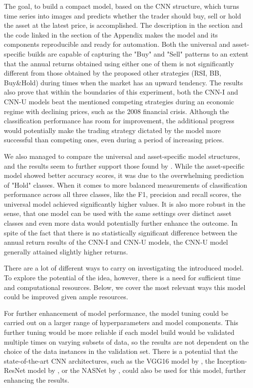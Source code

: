 \documentclass[12pt, a4paper]{article}
\begin{document}
The goal, to build a compact model, based on the CNN structure, which turns time series into images and predicts whether the trader should buy, sell or hold the asset at the latest price, is accomplished. The description in the  section and the code linked in the  section of the Appendix makes the model and its components reproducible and ready for automation. 
Both the universal and asset-specific builds are capable of capturing the "Buy" and "Sell" patterns to an extent that the annual returns obtained using either one of them is not significantly different from those obtained by the proposed other strategies (RSI, BB, Buy\&Hold) during times when the market has an upward tendency.
The results also prove that within the boundaries of this experiment, both the CNN-I and CNN-U models beat the mentioned competing strategies during an economic regime with declining prices, such as the 2008 financial crisis. 
Although the classification performance has room for improvement, the additional progress would potentially make the trading strategy dictated by the model more successful than competing ones, even during a period of increasing prices. 

We also managed to compare the universal and asset-specific model structures, and the results seem to further support those found by \cite{sirignano2018universal}. While the asset-specific model showed better accuracy scores, it was due to the overwhelming prediction of "Hold" classes. 
When it comes to more balanced measurements of classification performance across all three classes, like the F1, precision and recall scores, the universal model achieved significantly higher values. It is also more robust in the sense, that one model can be used with the same settings over distinct asset classes and even more data would potentially further enhance the outcome. In spite of the fact that there is no statistically significant difference between the annual return results of the CNN-I and CNN-U models, the CNN-U model generally attained slightly higher returns. 

There are a lot of different ways to carry on investigating the introduced model. To explore the potential of the idea, however, there is a need for sufficient time and computational resources. Below, we cover the most relevant ways this model could be improved given ample resources.

For further enhancement of model performance, the model tuning could be carried out on a larger range of hyperparameters and model components. This further tuning would be more reliable if each model build would be validated multiple times on varying subsets of data, so the results are not dependent on the choice of the data instances in the validation set. There is a potential that the state-of-the-art CNN architectures, such as the VGG16 model by \cite{simonyan2014very}, the Inception-ResNet model by \cite{szegedy2016inception}, or the NASNet by \cite{zoph2018learning}, could also be used for this model, further enhancing the results.
\end{document}
